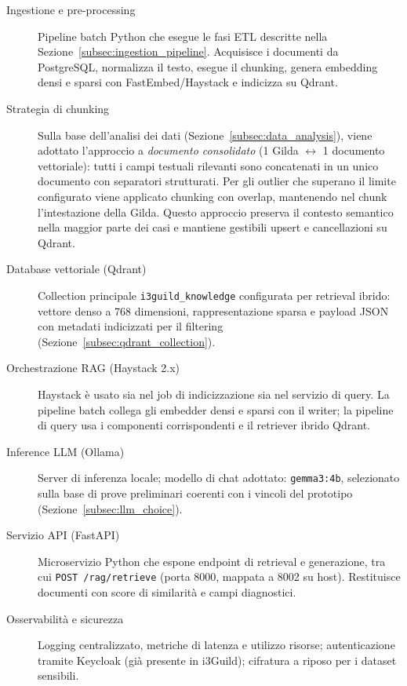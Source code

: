 \begin{description}
  \item[Ingestione e pre-processing]
    Pipeline batch Python che esegue le fasi ETL descritte nella
    Sezione~\ref{subsec:ingestion_pipeline}. Acquisisce i documenti da
    PostgreSQL, normalizza il testo, esegue il chunking, genera embedding densi
    e sparsi con FastEmbed/Haystack e indicizza su Qdrant.

  \item[Strategia di chunking] Sulla base dell'analisi dei dati
    (Sezione~\ref{subsec:data_analysis}), viene adottato l'approccio a
    \emph{documento consolidato} (1 Gilda $\leftrightarrow$ 1 documento
    vettoriale): tutti i campi testuali rilevanti sono concatenati in un unico
    documento con separatori strutturati. Per gli outlier che superano il limite
    configurato viene applicato chunking con overlap, mantenendo nel chunk
    l'intestazione della Gilda. Questo approccio preserva il contesto semantico
    nella maggior parte dei casi e mantiene gestibili upsert e cancellazioni su
    Qdrant.

  \item[Database vettoriale (Qdrant)] Collection principale
    \texttt{i3guild\_knowledge} configurata per retrieval ibrido: vettore denso
    a 768 dimensioni, rappresentazione sparsa e payload JSON con metadati
    indicizzati per il filtering (Sezione~\ref{subsec:qdrant_collection}).

  \item[Orchestrazione RAG (Haystack 2.x)] Haystack è usato sia nel job di
    indicizzazione sia nel servizio di query. La pipeline batch collega gli
    embedder densi e sparsi con il writer; la pipeline di query usa i
    componenti corrispondenti e il retriever ibrido Qdrant.

  \item[Inference LLM (Ollama)] Server di inferenza locale; modello di chat
    adottato: \texttt{gemma3:4b}, selezionato sulla base di prove preliminari
    coerenti con i vincoli del prototipo
    (Sezione~\ref{subsec:llm_choice}).

  \item[Servizio API (FastAPI)] Microservizio Python che espone endpoint di
    retrieval e generazione, tra cui \texttt{POST /rag/retrieve} (porta 8000,
    mappata a 8002 su host). Restituisce documenti con score di similarità e
    campi diagnostici.

  \item[Osservabilità e sicurezza] Logging centralizzato, metriche di latenza
    e utilizzo risorse; autenticazione tramite Keycloak (già presente in
    i3Guild); cifratura a riposo per i dataset sensibili.
\end{description}

